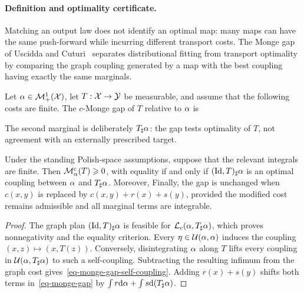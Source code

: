 \paragraph{Definition and optimality certificate.}

Matching an output law does not identify an optimal map: many maps can have the same push-forward while incurring different transport costs. The Monge gap of Uscidda and Cuturi~\cite{UsciddaCuturi2023} separates distributional fitting from transport optimality by comparing the graph coupling generated by a map with the best coupling having exactly the same marginals.

\begin{defn}\label{def-monge-gap}
	Let $\alpha\in\mathcal{M}_+^1(\mathcal{X})$, let $T:\mathcal{X}\to\mathcal{Y}$ be measurable, and assume that the following costs are finite. The $c$-Monge gap of $T$ relative to $\alpha$ is
\end{defn}

The second marginal is deliberately $T_\sharp\alpha$: the gap tests optimality of $T$, not agreement with an externally prescribed target.

\begin{prop}\label{prop-monge-gap-properties}
	Under the standing Polish-space assumptions, suppose that the relevant integrals are finite. Then $\mathcal M_\alpha^c(T)\geqslant0$, with equality if and only if $(\mathrm{Id},T)_\sharp\alpha$ is an optimal coupling between $\alpha$ and $T_\sharp\alpha$. Moreover,
	Finally, the gap is unchanged when $c(x,y)$ is replaced by $c(x,y)+r(x)+s(y)$, provided the modified cost remains admissible and all marginal terms are integrable.
\end{prop}
\begin{proof}
	The graph plan $(\mathrm{Id},T)_\sharp\alpha$ is feasible for $\mathcal{L}_c(\alpha,T_\sharp\alpha)$, which proves nonnegativity and the equality criterion. Every $\eta\in\mathcal{U}(\alpha,\alpha)$ induces the coupling $(x,z)\mapsto(x,T(z))$. Conversely, disintegrating $\alpha$ along $T$ lifts every coupling in $\mathcal{U}(\alpha,T_\sharp\alpha)$ to such a self-coupling. Subtracting the resulting infimum from the graph cost gives~\eqref{eq-monge-gap-self-coupling}. Adding $r(x)+s(y)$ shifts both terms in~\eqref{eq-monge-gap} by $\int r\mathrm{d}\alpha+\int s\mathrm{d}(T_\sharp\alpha)$.
\end{proof}

